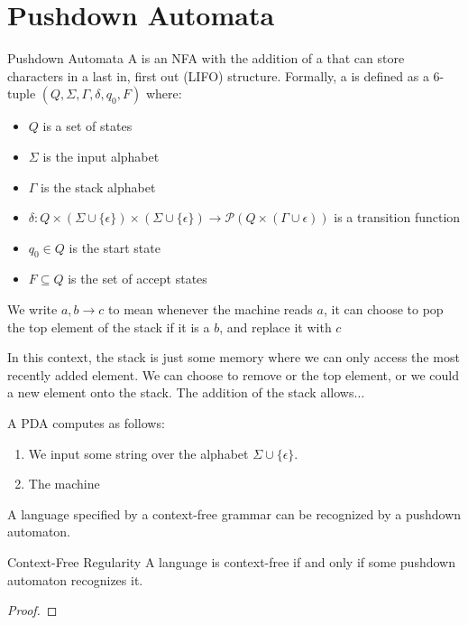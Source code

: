 \section{Pushdown Automata}
\begin{dfnbox}{Pushdown Automata}{}
    A  is an NFA with the addition of a  that can store characters in a last in, first out (LIFO) structure.
    \tcblower
    Formally, a  is defined as a 6-tuple $(Q, \Sigma, \Gamma, \delta, q_0, F)$ where:
    \begin{itemize}[noitemsep]
        \item $Q$ is a set of states
        \item $\Sigma$ is the input alphabet
        \item $\Gamma$ is the stack alphabet
        \item $\delta : Q \times (\Sigma \cup \{\epsilon\}) \times (\Sigma \cup \{\epsilon\}) \to \mathcal{P}(Q \times (\Gamma \cup \epsilon))$ is a transition function
        \item $q_0 \in Q$ is the start state
        \item $F \subseteq Q$ is the set of accept states
    \end{itemize}
    We write $a,b\to c$ to mean whenever the machine reads $a$, it can choose to pop the top element of the stack if it is a $b$, and replace it with $c$
\end{dfnbox}

In this context, the stack is just some memory where we can only access the most recently added element. We can choose to remove or  the top element, or we could  a new element onto the stack. The addition of the stack allows$\ldots$

A PDA computes as follows:
\begin{enumerate}
    \item We input some string over the alphabet $\Sigma \cup \{\epsilon\}$.
    \item The machine 
\end{enumerate}

A language specified by a context-free grammar can be recognized by a pushdown automaton.
\begin{thmbox}{Context-Free Regularity}{}
    A language is context-free if and only if some pushdown automaton recognizes it.
    \tcblower
    \begin{proof}

    \end{proof}
\end{thmbox}

